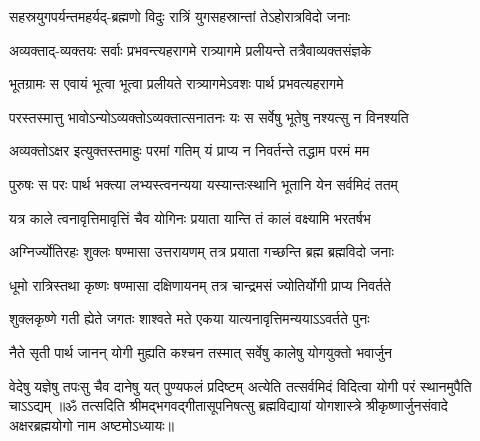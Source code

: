 \twolineshloka
{सहस्रयुगपर्यन्तमहर्यद्-ब्रह्मणो विदुः}
{रात्रिं युगसहस्रान्तां तेऽहोरात्रविदो जनाः}%

\twolineshloka
{अव्यक्ताद्-व्यक्तयः सर्वाः प्रभवन्त्यहरागमे}
{रात्र्यागमे प्रलीयन्ते तत्रैवाव्यक्तसंज्ञके}%

\twolineshloka
{भूतग्रामः स एवायं भूत्वा भूत्वा प्रलीयते}
{रात्र्यागमेऽवशः पार्थ प्रभवत्यहरागमे}%

\twolineshloka
{परस्तस्मात्तु भावोऽन्योऽव्यक्तोऽव्यक्तात्सनातनः}
{यः स सर्वेषु भूतेषु नश्यत्सु न विनश्यति}%

\twolineshloka
{अव्यक्तोऽक्षर इत्युक्तस्तमाहुः परमां गतिम्}
{यं प्राप्य न निवर्तन्ते तद्धाम परमं मम}%

\twolineshloka
{पुरुषः स परः पार्थ भक्त्या लभ्यस्त्वनन्यया}
{यस्यान्तःस्थानि भूतानि येन सर्वमिदं ततम्}%

\twolineshloka
{यत्र काले त्वनावृत्तिमावृत्तिं चैव योगिनः}
{प्रयाता यान्ति तं कालं वक्ष्यामि भरतर्षभ}%

\twolineshloka
{अग्निर्ज्योतिरहः शुक्लः षण्मासा उत्तरायणम्}
{तत्र प्रयाता गच्छन्ति ब्रह्म ब्रह्मविदो जनाः}%

\twolineshloka
{धूमो रात्रिस्तथा कृष्णः षण्मासा दक्षिणायनम्}
{तत्र चान्द्रमसं ज्योतिर्योगी प्राप्य निवर्तते}%

\twolineshloka
{शुक्लकृष्णे गती ह्येते जगतः शाश्वते मते}
{एकया यात्यनावृत्तिमन्ययाऽऽवर्तते पुनः}%

\twolineshloka
{नैते सृती पार्थ जानन् योगी मुह्यति कश्चन}
{तस्मात् सर्वेषु कालेषु योगयुक्तो भवार्जुन}%

\fourlineindentedshloka
{वेदेषु यज्ञेषु तपःसु चैव}
{दानेषु यत् पुण्यफलं प्रदिष्टम्}
{अत्येति तत्सर्वमिदं विदित्वा}
{योगी परं स्थानमुपैति चाऽऽद्यम्}%
{॥ॐ तत्सदिति श्रीमद्भगवद्गीतासूपनिषत्सु ब्रह्मविद्यायां योगशास्त्रे श्रीकृष्णार्जुनसंवादे अक्षरब्रह्मयोगो नाम अष्टमोऽध्यायः॥}